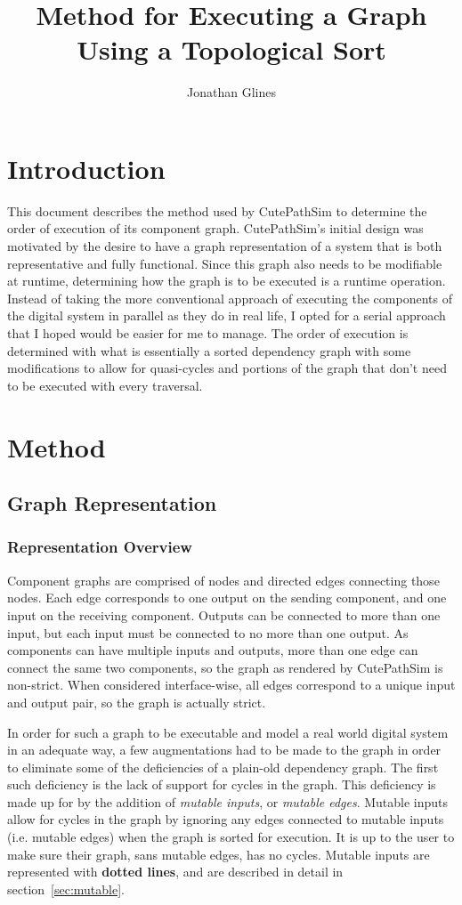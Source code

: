 \documentclass[12pt]{article}
\begin{document}
\title{Method for Executing a Graph Using a Topological Sort}
\author{Jonathan Glines}
\maketitle
\tableofcontents
\section{Introduction}
This document describes the method used by CutePathSim to determine the order of execution of its component graph. CutePathSim's initial design was motivated by the desire to have a graph representation of a system that is both representative and fully functional. Since this graph also needs to be modifiable at runtime, determining how the graph is to be executed is a runtime operation. Instead of taking the more conventional approach of executing the components of the digital system in parallel as they do in real life, I opted for a serial approach that I hoped would be easier for me to manage. The order of execution is determined with what is essentially a sorted dependency graph with some modifications to allow for quasi-cycles and portions of the graph that don't need to be executed with every traversal.

\section{Method}
\subsection{Graph Representation}
\subsubsection{Representation Overview}
Component graphs are comprised of nodes and directed edges connecting those nodes. Each edge corresponds to one output on the sending component, and one input on the receiving component. Outputs can be connected to more than one input, but each input must be connected to no more than one output. As components can have multiple inputs and outputs, more than one edge can connect the same two components, so the graph as rendered by CutePathSim is non-strict. When considered interface-wise, all edges correspond to a unique input and output pair, so the graph is actually strict.

In order for such a graph to be executable and model a real world digital system in an adequate way, a few augmentations had to be made to the graph in order to eliminate some of the deficiencies of a plain-old dependency graph. The first such deficiency is the lack of support for cycles in the graph. This deficiency is made up for by the addition of \textsl{mutable inputs}, or \textsl{mutable edges}. Mutable inputs allow for cycles in the graph by ignoring any edges connected to mutable inputs ({i.e.} mutable edges) when the graph is sorted for execution. It is up to the user to make sure their graph, sans mutable edges, has no cycles. Mutable inputs are represented with \textbf{dotted lines}, and are described in detail in section~\ref{sec:mutable}. 
\end{document}
